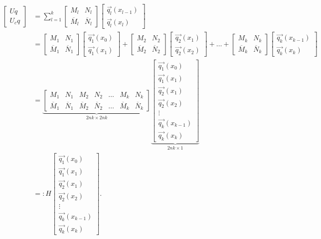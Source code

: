 \documentclass[10pt,reqno,oneside,a4paper]{article}
\begin{document}
\begin{align}
\begin{bmatrix}
Uq \\
U_c q
\end{bmatrix} 
&=
\sum^k_{l=1}
\begin{bmatrix}
M_l & N_l \\
\overline{M}_l & \overline{N}_l 
\end{bmatrix} 
\begin{bmatrix}
\vec{q_l}(x_{l-1})  \\
\vec{q_l}(x_{l})
\end{bmatrix} \nonumber \\
&= 
\begin{bmatrix}
M_1 & N_1 \\
\overline{M}_1 & \overline{N}_1
\end{bmatrix} 
\begin{bmatrix}
\vec{q_1}(x_{0})  \\
\vec{q_1}(x_1)
\end{bmatrix} 
+ 
\begin{bmatrix}
M_2 & N_2 \\
\overline{M}_2 & \overline{N}_2
\end{bmatrix} 
\begin{bmatrix}
\vec{q_2}(x_1)  \\
\vec{q_2}(x_2)
\end{bmatrix} 
+ \ldots +
\begin{bmatrix}
M_k & N_k \\
\overline{M}_k & \overline{N}_k
\end{bmatrix} 
\begin{bmatrix}
\vec{q_k}(x_{k-1})  \\
\vec{q_k}(x_k)
\end{bmatrix} \nonumber \\
&= 
\underbrace{
\begin{bmatrix}
M_1 & N_1 & M_2 & N_2 & \ldots & M_k & N_k \\
\overline{M}_1 & \overline{N}_1 & \overline{M}_2 & \overline{N}_2 & \ldots & \overline{M}_k & \overline{N}_k
\end{bmatrix} }_\text{$2nk \times 2nk$}
\underbrace{\begin{bmatrix}
\vec{q_1}(x_{0})  \\
\vec{q_1}(x_1) \\
\vec{q_2}(x_1)  \\
\vec{q_2}(x_2) \\
\vdots \\
\vec{q_k}(x_{k-1})  \\
\vec{q_k}(x_k)
\end{bmatrix}}_\text{$2nk\times 1$} \nonumber \\
&=:
H
\begin{bmatrix}
\vec{q_1}(x_{0})  \\
\vec{q_1}(x_1) \\
\vec{q_2}(x_1)  \\
\vec{q_2}(x_2) \\
\vdots \\
\vec{q_k}(x_{k-1})  \\
\vec{q_k}(x_k)
\end{bmatrix}. \label{P2.BFF-H}
\end{align}
\end{document}
